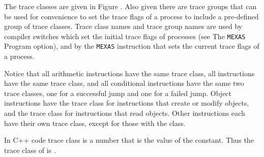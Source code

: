 \documentclass[12pt]{article}
\begin{document}
The trace classes are given in Figure .
Also given there are trace groups that can be used for convenience
to set the trace flags of a process to include
a pre-defined group of trace classes.
Trace class names and trace group names are used by compiler switches
which set the initial trace flags of processes
(see The {\tt MEXAS} Program  option),
and by the {\tt MEXAS}
 instruction
that sets the current trace flags
of a process.

Notice that all arithmetic instructions have the same
trace class, all  instructions have the same trace
class, and all conditional  instructions have the
same two trace classes, one for a successful jump and one for
a failed jump.  Object instructions have the  trace class for
instructions that create or modify objects, and the  trace
class for instructions that read objects.
Other instructions each have their own trace class,
except for those with the  class.

In C++ code trace class  is a number that is the value of
the  constant.  Thus the trace class of 
is .
\end{document}
